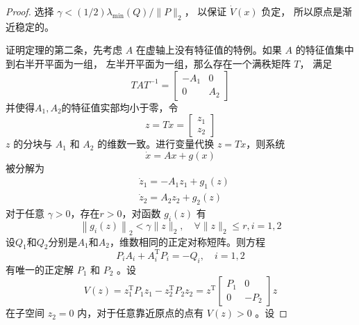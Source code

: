 \begin{proof}
    选择 $\gamma<(1 / 2) \lambda_{\min }(Q) /\|P\|_2$， 以保证 $\dot{V}(x)$ 负定，
    所以原点是渐近稳定的。\par
    证明定理的第二条，先考虑 $A$ 在虚轴上没有特征值的特例。如果 $A$ 的特征值集中到右半开平面为一组，
    左半开平面为一组，那么存在一个满秩矩阵 $T$， 满足
    \begin{equation}
        T A T^{-1}=\left[\begin{array}{cc}
        -A_1 & 0 \\
        0 & A_2
        \end{array}\right]
    \end{equation}
    并使得$A_1,A_2$的特征值实部均小于零，令
    \begin{equation}
        z=T x=\left[\begin{array}{l}
        z_1 \\
        z_2
        \end{array}\right]
    \end{equation}
    $z$ 的分块与 $A_1$ 和 $A_2$ 的维数一致。进行变量代换 $z=T x$，则系统
    \begin{equation}
        \dot{x}=A x+g(x)
    \end{equation}
    被分解为
    \begin{equation}
        \begin{aligned}
        & \dot{z}_1=-A_1 z_1+g_1(z) \\
        & \dot{z}_2=A_2 z_2+g_2(z)
        \end{aligned}
    \end{equation}
    对于任意 $\gamma>0$，存在$r>0$，对函数 $g_i(z)$ 有
    \begin{equation}
        \left\|g_i(z)\right\|_2<\gamma\|z\|_2, \quad \forall\|z\|_2 \leqslant r, i=1,2
    \end{equation}
    设$Q_1$和$Q_2$分别是$A_1$和$A_2$，维数相同的正定对称短阵。则方程
    \begin{equation}
        P_i A_i+A_i^{\mathrm{T}} P_i=-Q_i, \quad i=1,2
    \end{equation}
    有唯一的正定解 $P_1$ 和 $P_2$ 。设
    \begin{equation}
        V(z)=z_1^{\mathrm{T}} P_1 z_1-z_2^{\mathrm{T}} P_2 z_2=z^{\mathrm{T}}\left[\begin{array}{cc}
        P_1 & 0 \\
        0 & -P_2
        \end{array}\right] z
    \end{equation}
    在子空间 $z_2=0$ 内，对于任意靠近原点的点有 $V(z)>0$ 。设

\end{proof}
